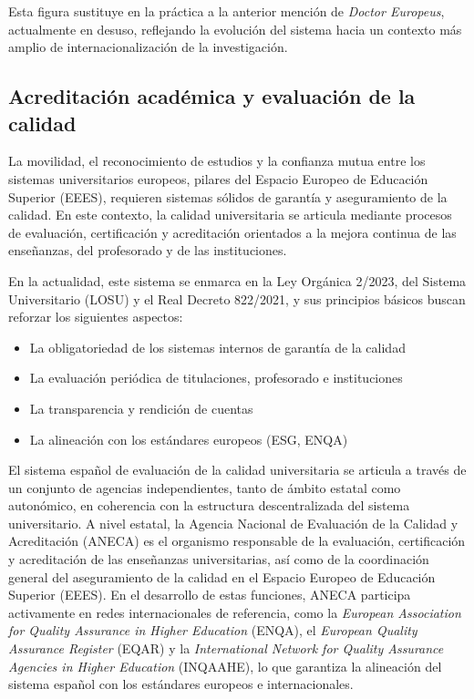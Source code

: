 \documentclass[
  11pt,
  a4paper,
  twoside]{scrreprt}
\providecommand{\tightlist}{%
  \setlength{\itemsep}{0pt}\setlength{\parskip}{0pt}}
\begin{document}
Esta figura sustituye en la práctica a la anterior mención de
\emph{Doctor Europeus}, actualmente en desuso, reflejando la evolución
del sistema hacia un contexto más amplio de internacionalización de la
investigación.

\subsection{Acreditación académica y evaluación de la
calidad}\label{sec-calidad}

La movilidad, el reconocimiento de estudios y la confianza mutua entre
los sistemas universitarios europeos, pilares del Espacio Europeo de
Educación Superior (EEES), requieren sistemas sólidos de garantía y
aseguramiento de la calidad. En este contexto, la calidad universitaria
se articula mediante procesos de evaluación, certificación y
acreditación orientados a la mejora continua de las enseñanzas, del
profesorado y de las instituciones.

En la actualidad, este sistema se enmarca en la Ley Orgánica 2/2023, del
Sistema Universitario (LOSU) y el Real Decreto 822/2021, y sus
principios básicos buscan reforzar los siguientes aspectos:

\begin{itemize}
\tightlist
\item
  La obligatoriedad de los sistemas internos de garantía de la calidad
\item
  La evaluación periódica de titulaciones, profesorado e instituciones
\item
  La transparencia y rendición de cuentas
\item
  La alineación con los estándares europeos (ESG, ENQA)
\end{itemize}

El sistema español de evaluación de la calidad universitaria se articula
a través de un conjunto de agencias independientes, tanto de ámbito
estatal como autonómico, en coherencia con la estructura descentralizada
del sistema universitario. A nivel estatal, la Agencia Nacional de
Evaluación de la Calidad y Acreditación (ANECA) es el organismo
responsable de la evaluación, certificación y acreditación de las
enseñanzas universitarias, así como de la coordinación general del
aseguramiento de la calidad en el Espacio Europeo de Educación Superior
(EEES). En el desarrollo de estas funciones, ANECA participa activamente
en redes internacionales de referencia, como la \emph{European
Association for Quality Assurance in Higher Education} (ENQA), el
\emph{European Quality Assurance Register} (EQAR) y la
\emph{International Network for Quality Assurance Agencies in Higher
Education} (INQAAHE), lo que garantiza la alineación del sistema español
con los estándares europeos e internacionales.
\end{document}
